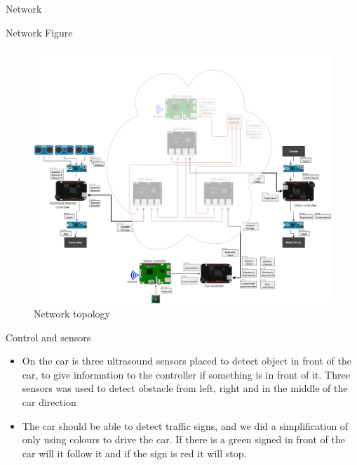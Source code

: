 \documentclass[final,hyperref={pdfpagelabels=false}]{beamer}
\begin{document}
\begin{frame}[t]
\begin{columns}[t]
\begin{column}{.465\textwidth}
\begin{block}{Network}
    

\end{block}

\begin{block}{Network Figure}
    \begin{figure}
        \includegraphics[width=1\linewidth]{network.png}
        \caption{Network topology}
        \label{pic:network}
        \end{figure}
    
\end{block}


\begin{block}{Control and sensors}

\begin{itemize}
    \item On the car is three ultrasound sensors placed to detect object in front of the car, to give information to the controller if something is in front of it. Three sensors was used to detect obstacle from left, right and in the middle of the car direction
    
    \item The car should be able to detect traffic signs, and we did a simplification of only using colours to drive the car. If there is a green signed in front of the car will it follow it and if the sign is red it will stop.  
    

\end{itemize}
\end{block}
\end{column}
\end{columns}
\end{frame}
\end{document}

